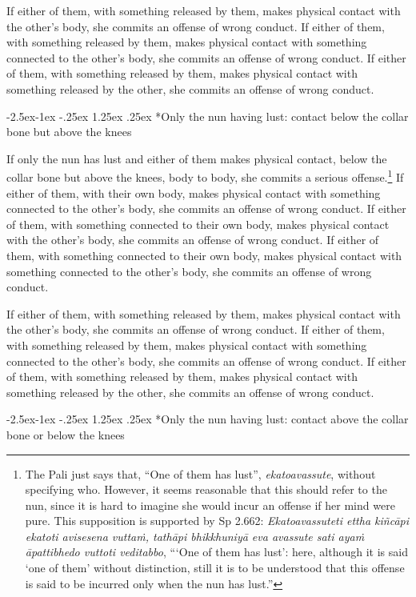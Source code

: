 \documentclass[12pt,openany]{book}%
\makeatletter
\renewcommand\subparagraph{\@startsection{subparagraph}{5}{\z@}%
            {-2.5ex\@plus -1ex \@minus -.25ex}%
            {1.25ex \@plus .25ex}%
            {\noindent\normalfont\itshape\footnotesize}}
\makeatother
\begin{document}
If either of them, with something released by them, makes physical contact with the other’s body, she commits an offense of wrong conduct. If either of them, with something released by them, makes physical contact with something connected to the other’s body, she commits an offense of wrong conduct. If either of them, with something released by them, makes physical contact with something released by the other, she commits an offense of wrong conduct. 

\subparagraph*{Only the nun having lust: contact below the collar bone but above the knees }

If only the nun has lust and either of them makes physical contact, below the collar bone but above the knees, body to body, she commits a serious offense.\footnote{The Pali just says that, “One of them has lust”, \textit{ekatoavassute}, without specifying who. However, it seems reasonable that this should refer to the nun, since it is hard to imagine she would incur an offense if her mind were pure. This supposition is supported by Sp 2.662: \textit{Ekatoavassuteti ettha \textsanskrit{kiñcāpi} ekatoti avisesena \textsanskrit{vuttaṁ}, \textsanskrit{tathāpi} \textsanskrit{bhikkhuniyā} eva avassute sati \textsanskrit{ayaṁ} \textsanskrit{āpattibhedo} vuttoti veditabbo}, “‘One of them has lust’: here, although it is said ‘one of them’ without distinction, still it is to be understood that this offense is said to be incurred only when the nun has lust.” } If either of them, with their own body, makes physical contact with something connected to the other’s body, she commits an offense of wrong conduct. If either of them, with something connected to their own body, makes physical contact with the other’s body, she commits an offense of wrong conduct. If either of them, with something connected to their own body, makes physical contact with something connected to the other’s body, she commits an offense of wrong conduct. 

If either of them, with something released by them, makes physical contact with the other’s body, she commits an offense of wrong conduct. If either of them, with something released by them, makes physical contact with something connected to the other’s body, she commits an offense of wrong conduct. If either of them, with something released by them, makes physical contact with something released by the other, she commits an offense of wrong conduct. 

\subparagraph*{Only the nun having lust: contact above the collar bone or below the knees }
\end{document}
